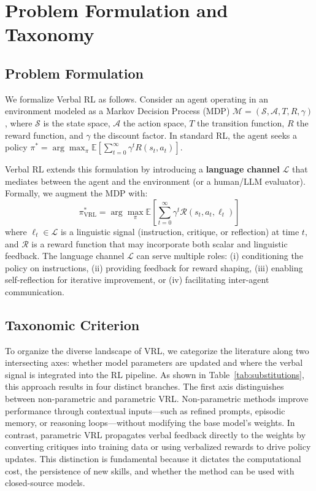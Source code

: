 \section{Problem Formulation and Taxonomy}
\subsection{Problem Formulation}
\label{sec:formulation}

We formalize Verbal RL as follows. Consider an agent operating in an environment modeled as a Markov Decision Process (MDP) $\mathcal{M} = (\mathcal{S}, \mathcal{A}, T, R, \gamma)$, where $\mathcal{S}$ is the state space, $\mathcal{A}$ the action space, $T$ the transition function, $R$ the reward function, and $\gamma$ the discount factor. In standard RL, the agent seeks a policy $\pi^* = \arg\max_\pi \mathbb{E}\left[\sum_{t=0}^{\infty} \gamma^t R(s_t, a_t)\right]$.

Verbal RL extends this formulation by introducing a \textbf{language channel} $\mathcal{L}$ that mediates between the agent and the environment (or a human/LLM evaluator). Formally, we augment the MDP with:
\begin{equation}
\pi^*_{\text{VRL}} = \arg\max_\pi \mathbb{E}\left[\sum_{t=0}^{\infty} \gamma^t \mathcal{R}(s_t, a_t, \ell_t)\right]
\end{equation}
where $\ell_t \in \mathcal{L}$ is a linguistic signal (instruction, critique, or reflection) at time $t$, and $\mathcal{R}$ is a reward function that may incorporate both scalar and linguistic feedback. The language channel $\mathcal{L}$ can serve multiple roles: (i) conditioning the policy on instructions, (ii) providing feedback for reward shaping, (iii) enabling self-reflection for iterative improvement, or (iv) facilitating inter-agent communication.


\subsection{Taxonomic Criterion}
\label{sec:taxonomy-criterion}

To organize the diverse landscape of VRL, we categorize the literature along two intersecting axes: whether model parameters are updated and where the verbal signal is integrated into the RL pipeline. As shown in Table~\ref{tab:substitutions}, this approach results in four distinct branches. The first axis distinguishes between non-parametric and parametric VRL. Non-parametric methods improve performance through contextual inputs—such as refined prompts, episodic memory, or reasoning loops—without modifying the base model's weights. In contrast, parametric VRL propagates verbal feedback directly to the weights by converting critiques into training data or using verbalized rewards to drive policy updates. This distinction is fundamental because it dictates the computational cost, the persistence of new skills, and whether the method can be used with closed-source models.


